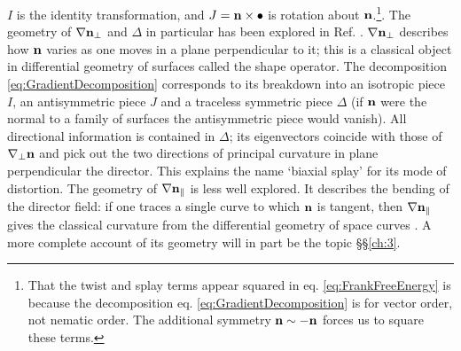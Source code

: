 $I$ is the identity transformation, and $J= \bf n \times \bullet$ is rotation about $\bf n$.\footnote{That the twist and splay terms appear squared in eq. \ref{eq:FrankFreeEnergy} is because the decomposition eq. \ref{eq:GradientDecomposition} is for vector order, not nematic order. The additional symmetry $\bf n \sim -n$ forces us to square these terms.}. The geometry of $\nabla \bf n_\perp$ and $\Delta$ in particular has been explored in Ref. \cite{Machon}. $\nabla \bf n_\perp$ describes how $\bf n$ varies as one moves in a plane perpendicular to it; this is a classical object in differential geometry of surfaces called the shape operator. The decomposition \ref{eq:GradientDecomposition} corresponds to its breakdown into an isotropic piece $I$, an antisymmetric piece $J$ and a traceless symmetric piece $\Delta$ (if $\bf n$ were the normal to a family of surfaces the antisymmetric piece would vanish). All directional information is contained in $\Delta$; its eigenvectors coincide with those of $\nabla_\perp \bf n$ and pick out the two directions of principal curvature in plane perpendicular the director. This explains the name `biaxial splay' for its mode of distortion. The geometry of $\nabla \bf n_\parallel$ is less well explored. It describes the bending of the director field: if one traces a single curve to which $\bf n$ is tangent, then $\nabla \bf n _\parallel$ gives the classical curvature from the differential geometry of space curves \cite{DoCarmo}. A more complete account of its geometry will in part be the topic \S\S\ref{ch:3}.
 
